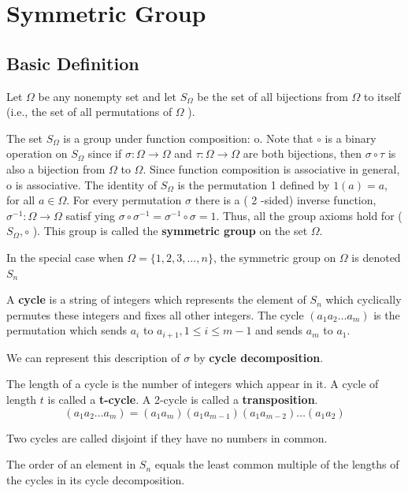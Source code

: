 \chapter{Symmetric Group}

\section{Basic Definition}
\begin{definition}
    Let $\Omega$ be any nonempty set and let $S_{\Omega}$ be the set of all bijections from $\Omega$ to itself (i.e., the set of all permutations of $\Omega$ ).

    The set $S_{\Omega}$ is a group under function composition: o. Note that $\circ$ is a binary operation on $S_{\Omega}$ since if $\sigma: \Omega \rightarrow \Omega$ and $\tau: \Omega \rightarrow \Omega$ are both bijections, then $\sigma \circ \tau$ is also a bijection from $\Omega$ to $\Omega$. Since function composition is associative in general, o is associative. The identity of $S_{\Omega}$ is the permutation 1 defined by $1(a)=a$, for all $a \in \Omega$. For every permutation $\sigma$ there is a ( 2 -sided) inverse function, $\sigma^{-1}: \Omega \rightarrow \Omega$ satisf ying $\sigma \circ \sigma^{-1}=\sigma^{-1} \circ \sigma=1$. Thus, all the group axioms hold for ( $S_{\Omega}, \circ$ ). This group is called the \textbf{symmetric group} on the set $\Omega$.

    In the special case when $\Omega=\{1,2,3, \ldots, n\}$, the symmetric group on $\Omega$ is denoted $S_n$

    A \textbf{cycle} is a string of integers which represents the element of $S_n$ which cyclically permutes these integers and fixes all other integers. The cycle $\left(a_1 a_2 \ldots a_m\right)$ is the permutation which sends $a_i$ to $a_{i+1}, 1 \leq i \leq m-1$ and sends $a_m$ to $a_1$.

    We can represent this description of $\sigma$ by \textbf{cycle decomposition}.

    The length of a cycle is the number of integers which appear in it. A cycle of length $t$ is called a \textbf{t-cycle}.
    A 2-cycle is called a \textbf{transposition}.
    \[
        \left(a_1 a_2 \ldots a_m\right)=\left(a_1 a_m\right)\left(a_1 a_{m-1}\right)\left(a_1 a_{m-2}\right) \ldots\left(a_1 a_2\right)
    \]

    Two cycles are called disjoint if they have no numbers in common.
\end{definition}
\begin{proposition}
    The order of an element in $S_n$ equals the least common multiple of the lengths
    of the cycles in its cycle decomposition.
\end{proposition}
